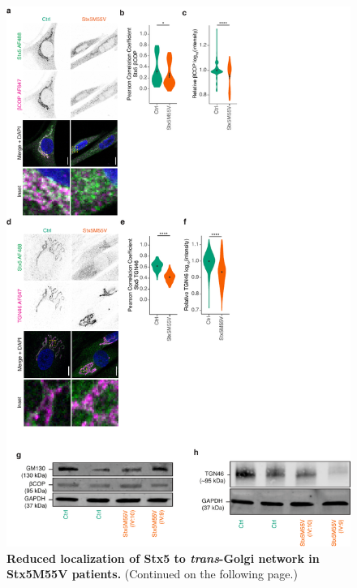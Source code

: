 \clearpage

\begin{figure}
    \includegraphics[keepaspectratio=true,width=\textwidth,height=\textheight]{chapters/chapter6/chapter6_SupplementaryFigure11.pdf}
    \caption{\textbf{Reduced localization of Stx5 to \emph{trans}-Golgi network in Stx5M55V patients.} (Continued on the following page.)}
    \label{fig:ch6supfig11}
\end{figure}

